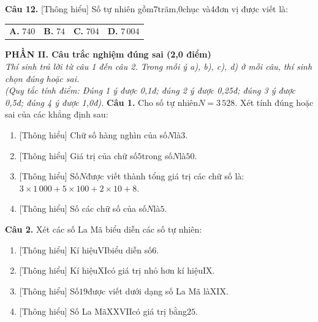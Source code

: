 \documentclass[11pt,a4paper]{article}
\begin{document}
\noindent\textbf{Câu 12.} [Thông hiểu] Số tự nhiên gồm$7$trăm,$0$chục và$4$đơn vị được viết là:\par\vspace{2pt}
\noindent\begin{tabular*}{\textwidth}{@{\extracolsep{\fill}}llll@{}}
\textbf{A.} $740$ & \textbf{B.} $74$ & \textbf{C.} $704$ & \textbf{D.} $7\,004$
\end{tabular*}\par\vspace{5pt}


\vspace{6pt}
\noindent
\textbf{\large PHẦN II. Câu trắc nghiệm đúng sai (2,0 điểm)}\\
\textit{\small Thí sinh trả lời từ câu 1 đến câu 2. Trong mỗi ý a), b), c), d) ở mỗi câu, thí sinh chọn đúng hoặc sai.}\\
\textit{\small (Quy tắc tính điểm: Đúng 1 ý được 0,1đ; đúng 2 ý được 0,25đ; đúng 3 ý được 0,5đ; đúng 4 ý được 1,0đ).}
\vspace{6pt}
\noindent\textbf{Câu 1.} Cho số tự nhiên$N = 3\,528$. Xét tính đúng hoặc sai của các khẳng định sau:\par\vspace{2pt}
\begin{enumerate}[label=\textbf{\alph*)}, leftmargin=1.2cm, itemsep=2pt, topsep=2pt]
  \item \textnormal{[Thông hiểu]} Chữ số hàng nghìn của số$N$là$3$.
  \item \textnormal{[Thông hiểu]} Giá trị của chữ số$5$trong số$N$là$50$.
  \item \textnormal{[Thông hiểu]} Số$N$được viết thành tổng giá trị các chữ số là:$3 \times 1\,000 + 5 \times 100 + 2 \times 10 + 8$.
  \item \textnormal{[Thông hiểu]} Số các chữ số của số$N$là$5$.
\end{enumerate}
\vspace{6pt}

\noindent\textbf{Câu 2.} Xét các số La Mã biểu diễn các số tự nhiên:\par\vspace{2pt}
\begin{enumerate}[label=\textbf{\alph*)}, leftmargin=1.2cm, itemsep=2pt, topsep=2pt]
  \item \textnormal{[Thông hiểu]} Kí hiệu$\mathrm{VI}$biểu diễn số$6$.
  \item \textnormal{[Thông hiểu]} Kí hiệu$\mathrm{XI}$có giá trị nhỏ hơn kí hiệu$\mathrm{IX}$.
  \item \textnormal{[Thông hiểu]} Số$19$được viết dưới dạng số La Mã là$\mathrm{XIX}$.
  \item \textnormal{[Thông hiểu]} Số La Mã$\mathrm{XXVII}$có giá trị bằng$25$.
\end{enumerate}
\vspace{6pt}
\end{document}
